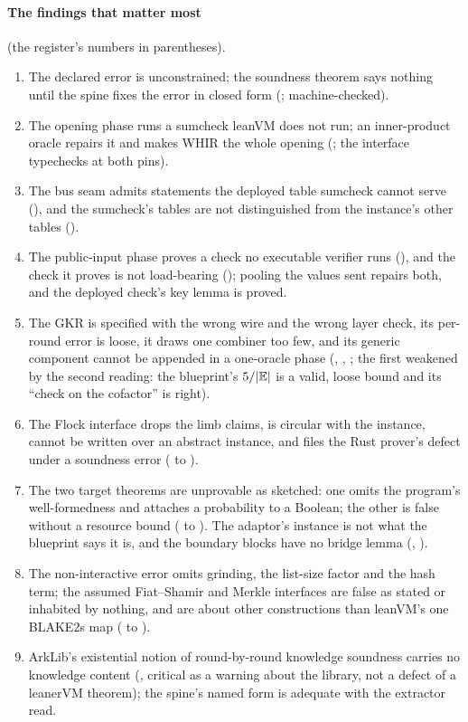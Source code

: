 \paragraph{The findings that matter most} (the register's numbers in parentheses).
\begin{enumerate}
\item The declared error is unconstrained; the soundness theorem says nothing until the spine
  fixes the error in closed form (; machine-checked).
\item The opening phase runs a sumcheck leanVM does not run; an inner-product oracle repairs
  it and makes WHIR the whole opening (; the interface typechecks at both pins).
\item The bus seam admits statements the deployed table sumcheck cannot serve (),
  and the sumcheck's tables are not distinguished from the instance's other tables
  ().
\item The public-input phase proves a check no executable verifier runs (), and the
  check it proves is not load-bearing (); pooling the values sent repairs both, and
  the deployed check's key lemma is proved.
\item The GKR is specified with the wrong wire and the wrong layer check, its per-round error
  is loose, it draws one combiner too few, and its generic component cannot be appended in a
  one-oracle phase (, , ; the first weakened by the second reading:
  the blueprint's $5/\lvert \mathbb{E}\rvert$ is a valid, loose bound and its \enquote{check on the cofactor}
  is right).
\item The Flock interface drops the limb claims, is circular with the instance, cannot be
  written over an abstract instance, and files the Rust prover's defect under a soundness error
  ( to ).
\item The two target theorems are unprovable as sketched: one omits the program's
  well-formedness and attaches a probability to a Boolean; the other is false without a resource
  bound ( to ). The adaptor's instance is not what the blueprint says it is,
  and the boundary blocks have no bridge lemma (, ).
\item The non-interactive error omits grinding, the list-size factor and the hash term; the
  assumed Fiat--Shamir and Merkle interfaces are false as stated or inhabited by nothing, and
  are about other constructions than leanVM's one BLAKE2s map ( to ).
\item ArkLib's existential notion of round-by-round knowledge soundness carries no knowledge
  content (, critical as a warning about the library, not a defect of a leanerVM
  theorem); the spine's named form is adequate with the extractor read.
\end{enumerate}
